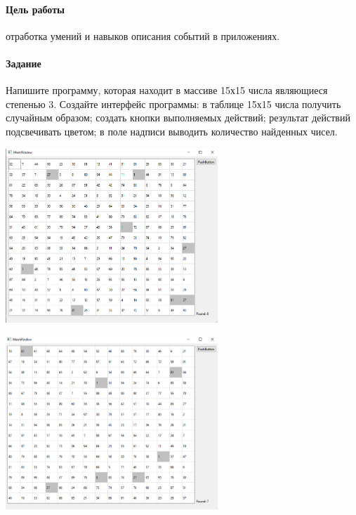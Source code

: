 \paragraph{Цель работы}
отработка умений и навыков описания событий в приложениях.

\paragraph{Задание}
Напишите программу, которая находит в массиве 15х15 числа являющиеся степенью 3. Создайте интерфейс программы: в таблице 15х15 числа получить случайным образом; создать кнопки выполняемых действий; результат действий подсвечивать цветом; в поле надписи выводить количество найденных чисел.




\includegraphics[width=0.6\textwidth]{scr1.PNG}

\includegraphics[width=0.6\textwidth]{scr2.PNG}